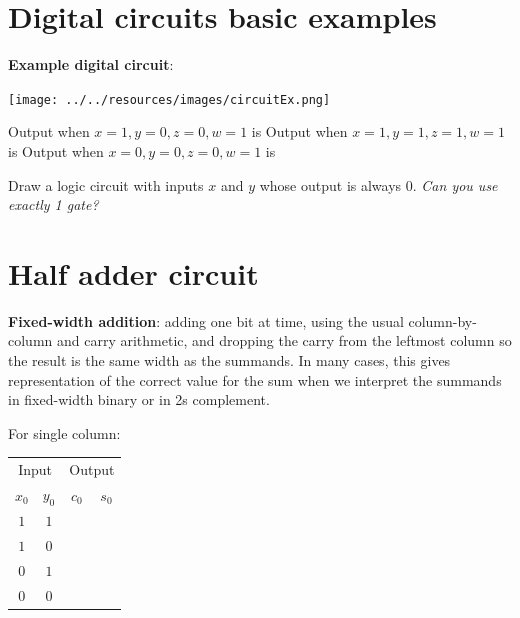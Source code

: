 \documentclass[12pt, oneside]{article}
\begin{document}
%
 \vfill
\section*{Digital circuits basic examples}


{\bf Example digital circuit}: 

\begin{multicols}{2}
\begin{center}
   \texttt{[image: ../../resources/images/circuitEx.png]} 
\end{center}
\columnbreak
Output when $x=1, y=0, z=0, w = 1$ is \underline{\phantom{$~~~0~~~$}}
Output when $x=1, y=1, z=1, w = 1$ is \underline{\phantom{$~~~0~~~$}}
Output when $x=0, y=0, z=0, w = 1$ is \underline{\phantom{$~~~0~~~$}}
\end{multicols}



Draw a logic circuit with inputs $x$ and $y$ whose output  is always $0$.  {\it  Can you use exactly 1 gate?}


\vspace{40pt} \vfill
\section*{Half adder circuit}


{\bf Fixed-width addition}: adding one bit at time, using the usual column-by-column and carry arithmetic, and dropping the carry from the leftmost column so the result is the same width as the summands.  In many cases, this gives representation of the correct value for the sum when we interpret the summands
in fixed-width binary or in 2s complement.

For single column:
\begin{center}
\begin{tabular}{cc|cc}
\multicolumn{2}{c|}{Input}  & \multicolumn{2}{|c}{Output}  \\
$x_0$ & $y_0$ & $c_0$ & $s_0$  \\
\hline
$1$ & $1$ & \phantom{$1$} & \phantom{$0$} \\
$1$ & $0$ & \phantom{$0$} & \phantom{$1$}\\
$0$ & $1$ & \phantom{$0$} & \phantom{$1$}\\
$0$ & $0$ & \phantom{$0$} & \phantom{$0$}\\
\end{tabular}
\end{center}
\end{document}
